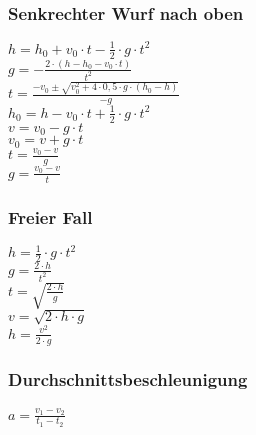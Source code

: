 \subsubsection{Senkrechter Wurf nach oben} 
\begin{minipage}{0.45\textwidth} 
$ h = h_{0}  + v_{0} \cdot t - \frac{1}{2}\cdot g\cdot t^{2} $\\ 
$ g = - \frac{2\cdot (h - h_{0}  - v_{0} \cdot t)}{     t^{2} } $\\ 
$ t = \frac{-v_{0}  \pm \sqrt{v_{0} ^{2} +4\cdot 0,5\cdot g\cdot (h_{0}  -h)}}{      -g} $\\ 
$ h_{0}  = h - v_{0} \cdot t + \frac{1}{2}\cdot g\cdot t^{2} $\\ 
$ v = v_{0}  - g\cdot t $\\ 
$ v_{0}  = v + g\cdot t $\\ 
$ t = \frac{v_{0} -v}{  g} $\\ 
$ g = \frac{v_{0}  - v}{  t} $\\ 
\end{minipage} 
\begin{minipage}{0.45\textwidth} 
 
\end{minipage} 
\subsubsection{Freier Fall} 
\begin{minipage}{0.45\textwidth} 
$ h = \frac{1}{2}\cdot g\cdot t^{2} $\\ 
$ g = \frac{2\cdot h}{ t^{2} } $\\ 
$ t = \sqrt{\frac{2\cdot h}{g}} $\\ 
$ v = \sqrt{2\cdot h\cdot g} $\\ 
$ h = \frac{ v^{2} }{2\cdot g} $\\ 
\end{minipage} 
\begin{minipage}{0.45\textwidth} 
 
\end{minipage} 
\subsubsection{Durchschnittsbeschleunigung} 
\begin{minipage}{0.45\textwidth} 
$ a = \frac{v_{1}  - v_{2} }{t_{1}  - t_{2} } $\\ 
\end{minipage} 
\begin{minipage}{0.45\textwidth} 
 
\end{minipage} 
